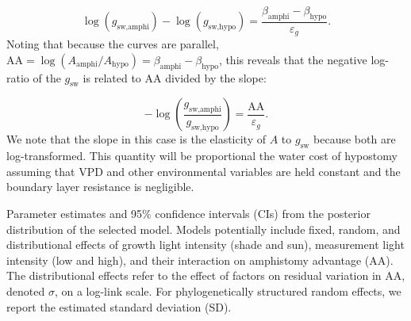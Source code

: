 \documentclass[
  letterpaper,
  DIV=11,
  numbers=noendperiod]{scrartcl}
\newcommand{\aax}{$\mathrm{AA}$}
\newcommand{\gsw}{$g_\text{sw}$}
\begin{document}
\[\log(g_\text{sw,amphi}) - \log(g_\text{sw,hypo}) = \frac{\beta_\text{amphi} - \beta_\text{hypo}}{\varepsilon_g}.\]
Noting that because the curves are parallel,
\(\mathrm{AA} = \log(A_\text{amphi} /A_\text{hypo}) = \beta_\text{amphi} - \beta_\text{hypo}\),
this reveals that the negative log-ratio of the \gsw{} is related to
\aax{} divided by the slope:

\[-\log\left(\frac{g_\text{sw,amphi}}{g_\text{sw,hypo}}\right) = \frac{\mathrm{AA}}{\varepsilon_g}.\]
We note that the slope in this case is the elasticity of \(A\) to \gsw{}
because both are log-transformed. This quantity will be proportional the
water cost of hypostomy assuming that VPD and other environmental
variables are held constant and the boundary layer resistance is
negligible.

\begin{table}

\caption{\label{tbl-fit_aa1}Parameter estimates and 95\% confidence
intervals (CIs) from the posterior distribution of the selected model.
Models potentially include fixed, random, and distributional effects of
growth light intensity (shade and sun), measurement light intensity (low
and high), and their interaction on amphistomy advantage
(\(\mathrm{AA}\)). The distributional effects refer to the effect of
factors on residual variation in \(\mathrm{AA}\), denoted \(\sigma\), on
a log-link scale. For phylogenetically structured random effects, we
report the estimated standard deviation (SD).}

\centering{

}
\end{table}
\end{document}
